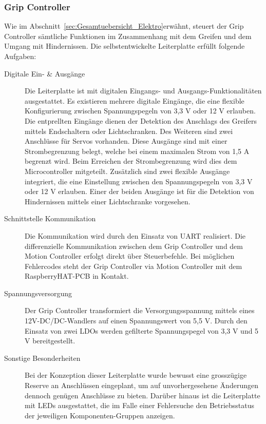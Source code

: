 \documentclass[main.tex]{subfiles} %
\begin{document}

\subsubsection{Grip Controller}
Wie im Abschnitt~\ref{sec:Gesamtuebersicht_Elektro}erwähnt, 
steuert der Grip Controller sämtliche Funktionen im Zusammenhang mit dem Greifen 
und dem Umgang mit Hindernissen. Die selbstentwickelte Leiterplatte erfüllt folgende
Aufgaben:

\begin{description}
      \item[Digitale Ein- \& Ausgänge] Die Leiterplatte ist mit digitalen Eingangs- 
      und Ausgangs-Funktionalitäten ausgestattet. Es existieren mehrere digitale Eingänge, 
      die eine flexible Konfigurierung zwischen Spannungspegeln von 3,3 V oder 12 V erlauben.
      Die entprellten Eingänge dienen der Detektion des Anschlags des Greifers mittels
      Endschaltern oder Lichtschranken. Des Weiteren sind zwei Anschlüsse für Servos vorhanden.
      Diese Ausgänge sind mit einer Strombegrenzung belegt, welche bei einem maximalen Strom
      von 1,5 A begrenzt wird. Beim Erreichen der Strombegrenzung wird dies dem Microcontroller 
      mitgeteilt. Zusätzlich sind zwei flexible Ausgänge integriert, die eine Einstellung
      zwischen den Spannungspegeln von 3,3 V oder 12 V erlauben. Einer der beiden Ausgänge
      ist für die Detektion von Hindernissen mittels einer Lichtschranke vorgesehen.
      
      \item[Schnittstelle Kommunikation] Die Kommunikation wird durch den Einsatz von
      UART realisiert. Die differenzielle Kommunikation zwischen dem Grip Controller 
      und dem Motion Controller
      erfolgt direkt über Steuerbefehle. Bei möglichen Fehlercodes steht der Grip
      Controller via Motion Controller mit dem RaspberryHAT-PCB in Kontakt.

      \item[Spannungsversorgung] Der Grip Controller transformiert die Versorgungsspannung 
      mittels eines 12V-DC/DC-Wandlers auf einen Spannungswert von 5,5 V. Durch den 
      Einsatz von zwei LDOs werden gefilterte Spannungspegel von 3,3 V und 5 V bereitgestellt.

      \item[Sonstige Besonderheiten] Bei der Konzeption dieser Leiterplatte wurde bewusst
      eine grosszügige Reserve an Anschlüssen eingeplant, um auf unvorhergesehene
      Änderungen dennoch genügen Anschlüsse zu bieten. Darüber hinaus ist die Leiterplatte
      mit LEDs ausgestattet, die im Falle einer Fehlersuche den Betriebsstatus der 
      jeweiligen Komponenten-Gruppen anzeigen.


\end{description}
\end{document}
